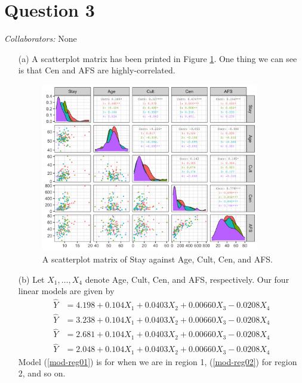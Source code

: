 \documentclass[10pt]{article}
\newcommand{\mycolaba}[1]{\textcolor{colabcol}{\textsl{Collaborators:}} #1}
\begin{document}
\section{Question 3} \noindent
\mycolaba{None}
\begin{itemize}
    \item[(a)] A scatterplot matrix has been printed in Figure \ref{fig-q03-corr}. One thing we can see is that Cen and AFS are highly-correlated. 
    \begin{figure}[ht]
        \centering
        \includegraphics[width = 0.9\textwidth]{img/q03-correlation.png}
        \caption{A scatterplot matrix of Stay against Age, Cult, Cen, and AFS.}
        \label{fig-q03-corr}
    \end{figure}
    \item[(b)] Let \(X_1, \ldots, X_4\) denote Age, Cult, Cen, and AFS, respectively. Our four linear models are given by 
    \begin{subequations}
        \begin{align}
            \hat{Y} &= 4.198 + 0.104 X_1 + 0.0403 X_2 + 0.00660 X_3 - 0.0208 X_4 \label{mod-reg01} \\
            \hat{Y} &= 3.238 + 0.104 X_1 + 0.0403 X_2 + 0.00660 X_3 - 0.0208 X_4 \label{mod-reg02} \\
            \hat{Y} &= 2.681 + 0.104 X_1 + 0.0403 X_2 + 0.00660 X_3 - 0.0208 X_4 \label{mod-reg03} \\
            \hat{Y} &= 2.048 + 0.104 X_1 + 0.0403 X_2 + 0.00660 X_3 - 0.0208 X_4 \label{mod-reg04}
        \end{align}
    \end{subequations}
    Model (\ref{mod-reg01}) is for when we are in region 1, (\ref{mod-reg02}) for region 2, and so on. 

\end{itemize}
\end{document}
